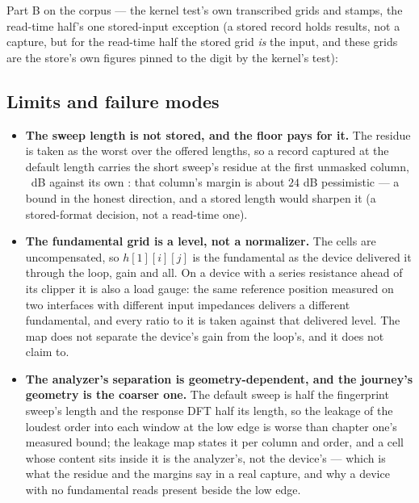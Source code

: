 \documentclass[11pt,a4paper]{article}
\begin{document}
Part B on the corpus --- the kernel test's own transcribed grids and
stamps, the read-time half's one stored-input exception (a stored record
holds results, not a capture, but for the read-time half the stored grid
\emph{is} the input, and these grids are the store's own figures pinned to
the digit by the kernel's test):

\begin{center}\small\jparityCorpusTable\end{center}

\subsection{Limits and failure modes}
\label{sec:journey-limits}
{\sloppy
\begin{itemize}
  \item \textbf{The sweep length is not stored, and the floor pays for
  it.} The residue is taken as the worst over the offered lengths, so a
  record captured at the default length carries the short sweep's residue
  at the first unmasked column, \journeyResidueColumnOneTwo\ dB against its
  own \journeyResidueColumnOneFive: that column's margin is about
  $24$ dB pessimistic --- a bound in the honest direction, and a stored
  length would sharpen it (a stored-format decision, not a read-time one).
  \item \textbf{The fundamental grid is a level, not a normalizer.} The
  cells are uncompensated, so $h[1][i][j]$ is the fundamental as the
  device delivered it through the loop, gain and all. On a device with a
  series resistance ahead of its clipper it is also a load gauge: the same
  reference position measured on two interfaces with different input
  impedances delivers a different fundamental, and every ratio to it is
  taken against that delivered level. The map does not separate the
  device's gain from the loop's, and it does not claim to.
  \item \textbf{The analyzer's separation is geometry-dependent, and the
  journey's geometry is the coarser one.} The default sweep is half the
  fingerprint sweep's length and the response DFT half its length, so the
  leakage of the loudest order into each window at the low edge is worse
  than chapter one's measured bound; the leakage map states it per column
  and order, and a cell whose content sits inside it is the analyzer's,
  not the device's --- which is what the residue and the margins say in a
  real capture, and why a device with no fundamental reads present beside
  the low edge.

\end{itemize}}
\end{document}
